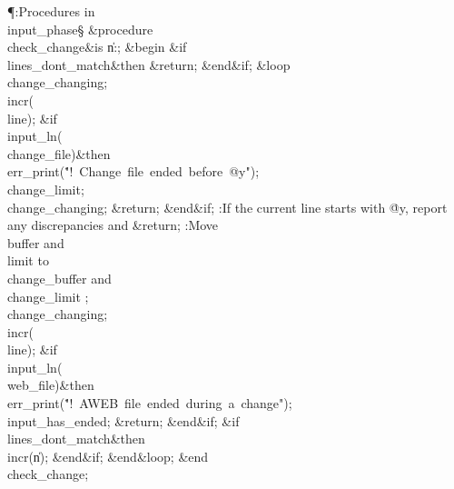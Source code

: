 \Y\P\?\4:Procedures in \\{input\_phase}\X\mathrel{+}\S\?\6
\&{procedure}\8\1\\{check\_change}\2\8\&{is}\8\1\6
\|n\?:\?\?\K{};\6
\4\&{begin}\6
\&{if}\1\1\8\\{lines\_dont\_match}\2\8\&{then}\6
\&{return};\2\6
\&{end}\8\2\&{if}\1;\6
\1\&{loop}\6
\\{change\_changing};\6
\\{incr}\?\1(\?\\{line}\?\2)\?;\6
\&{if}\1\1\?\8\R\?\\{input\_ln}\?\1(\?\\{change\_file}\?\2)\?\2\8\&{then}\6
\\{err\_print}\?\1(\?\.{"!\ Change\ file\ ended\ before\ @y"}\?\2)\?;\6
\\{change\_limit}\?\K{};\5
\\{change\_changing};\6
\&{return};\2\6
\&{end}\8\2\&{if}\1;\6
:If the current line starts with \.{@y}, report any discrepancies and %
\&{return}\X;\6
:Move \\{buffer} and \\{limit} to \\{change\_buffer} and \\{change\_limit}%
\X;\6
\\{change\_changing};\6
\\{incr}\?\1(\?\\{line}\?\2)\?;\6
\&{if}\1\1\?\8\R\?\\{input\_ln}\?\1(\?\\{web\_file}\?\2)\?\2\8\&{then}\6
\\{err\_print}\?\1(\?\.{"!\ AWEB\ file\ ended\ during\ a\ change"}\?\2)\?;\6
\\{input\_has\_ended}\?\K\?;\5
\&{return};\2\6
\&{end}\8\2\&{if}\1;\6
\&{if}\1\1\8\\{lines\_dont\_match}\2\8\&{then}\6
\\{incr}\?\1(\?\|n\?\2)\?;\2\6
\&{end}\8\2\&{if}\1;\2\6
\&{end}\8\&{loop};\2\6
\&{end}\8\\{check\_change};\par
\fi

